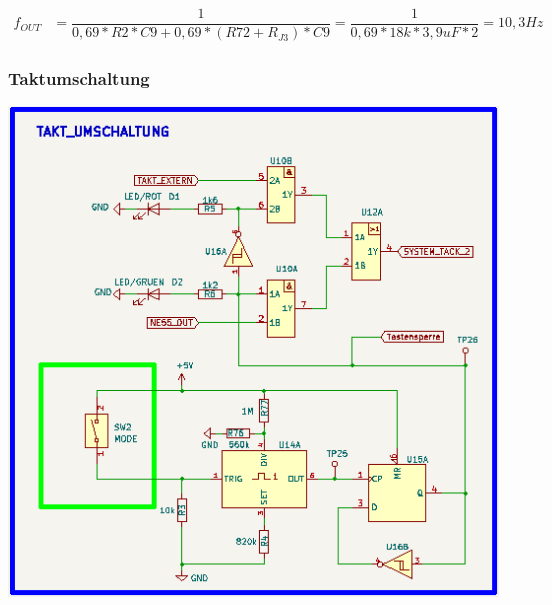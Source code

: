 \begin{center}
\begin{align}
	f_{OUT} &= \dfrac{1}{0,69*R2*C9 + 0,69*(R72+R_{J3})* C9} = \dfrac{1}{0,69*18k*3,9uF*2} = 10,3Hz
\end{align} 
\end{center}

\newpage
\subsubsection{Taktumschaltung}

\begin{center}
\includegraphics[width=13cm]{Bilder/Taktumschaltung.png}
\end{center}


